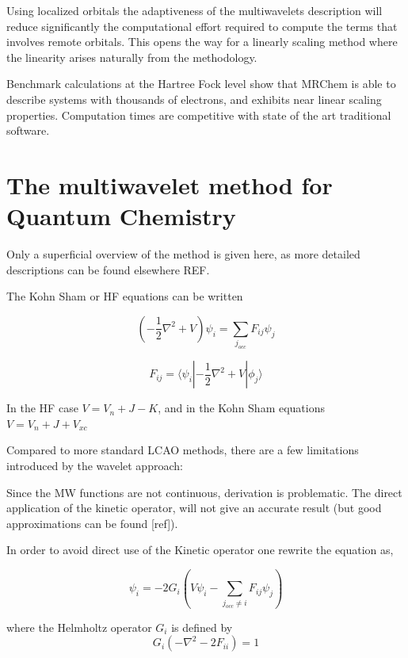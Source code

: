 \documentclass{article}
\begin{document}
Using localized orbitals the adaptiveness of the multiwavelets description will reduce significantly the computational effort required to compute the terms that involves remote orbitals. This opens the way for a linearly scaling method where the linearity arises naturally from the methodology.


Benchmark calculations at the Hartree Fock level show that MRChem is able to describe systems with thousands of electrons, and exhibits near linear scaling properties. Computation times are competitive with state of the art traditional software.


\section{The multiwavelet method for Quantum Chemistry}

Only a superficial overview of the method is given here, as more detailed descriptions can be found elsewhere REF.

The Kohn Sham or HF equations can be written

\begin{equation}
  (-\frac{1}{2}\nabla^2 + V) \psi_i = \sum_{j_{occ}} F_{ij} \psi_j
\end{equation}

\begin{equation}
  F_{ij} = \langle \psi_i |{-\frac{1}{2}\nabla^2+V}| {\phi_j}\rangle
\end{equation}

In the HF case $V=V_n+J-K$, and in the Kohn Sham equations $V=V_n+J+V_{xc}$

Compared to more standard LCAO methods, there are a few limitations introduced by the wavelet approach:

Since the  MW functions are not continuous, derivation is problematic. The direct application of the kinetic operator, will not give an accurate result (but good approximations can be found [ref]).

In order to avoid direct use of the Kinetic operator one rewrite the equation as, 

\begin{equation}
\psi_i = -2 G_{i}(V\psi_i - \sum_{j_{occ} \ne i} F_{ij} \psi_j)
\end{equation}

where the Helmholtz operator $G_{i}$ is defined by
\begin{equation}
G_{i}(-\nabla^2 - 2 F_{ii} )=1
\end{equation}
\end{document}
